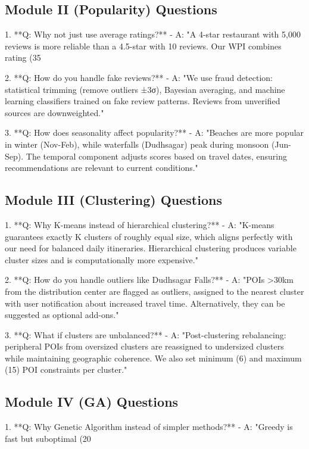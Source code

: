 \documentclass[12pt]{article}
\begin{document}
\subsection{Module II (Popularity) Questions}
1. **Q: Why not just use average ratings?**
   - A: "A 4-star restaurant with 5,000 reviews is more reliable than a 4.5-star with 10 reviews. Our WPI combines rating (35%

2. **Q: How do you handle fake reviews?**
   - A: "We use fraud detection: statistical trimming (remove outliers ±3σ), Bayesian averaging, and machine learning classifiers trained on fake review patterns. Reviews from unverified sources are downweighted."

3. **Q: How does seasonality affect popularity?**
   - A: "Beaches are more popular in winter (Nov-Feb), while waterfalls (Dudhsagar) peak during monsoon (Jun-Sep). The temporal component adjusts scores based on travel dates, ensuring recommendations are relevant to current conditions."

\subsection{Module III (Clustering) Questions}
1. **Q: Why K-means instead of hierarchical clustering?**
   - A: "K-means guarantees exactly K clusters of roughly equal size, which aligns perfectly with our need for balanced daily itineraries. Hierarchical clustering produces variable cluster sizes and is computationally more expensive."

2. **Q: How do you handle outliers like Dudhsagar Falls?**
   - A: "POIs >30km from the distribution center are flagged as outliers, assigned to the nearest cluster with user notification about increased travel time. Alternatively, they can be suggested as optional add-ons."

3. **Q: What if clusters are unbalanced?**
   - A: "Post-clustering rebalancing: peripheral POIs from oversized clusters are reassigned to undersized clusters while maintaining geographic coherence. We also set minimum (6) and maximum (15) POI constraints per cluster."

\subsection{Module IV (GA) Questions}
1. **Q: Why Genetic Algorithm instead of simpler methods?**
   - A: "Greedy is fast but suboptimal (20%
\end{document}
